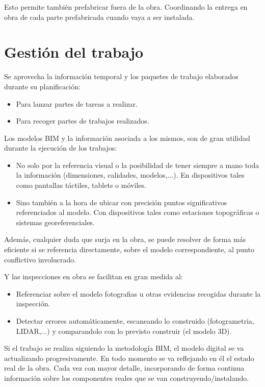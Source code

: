 \documentclass[spanish,12pt,a4paper,final,oneside]{book}
\begin{document}
Esto permite también prefabricar fuera de la obra. Coordinando la entrega en obra de cada parte prefabricada cuando vaya a ser instalada.

\section{Gestión del trabajo}
Se aprovecha la información temporal y los paquetes de trabajo elaborados durante su planificación:
\begin{itemize}
\item Para lanzar partes de tareas a realizar.
\item Para recoger partes de trabajos realizados.
\end{itemize}

Los modelos BIM y la información asociada a los mismos, son de gran utilidad durante la ejecución de los trabajos:
\begin{itemize}
\item No solo por la referencia visual o la posibilidad de tener siempre a mano toda la información (dimensiones, calidades, modelos,...). En dispositivos tales como pantallas táctiles, tablets o móviles.
\item Sino también a la hora de ubicar con precisión puntos significativos referenciados al modelo. Con dispositivos tales como estaciones topográficas o sistemas georeferenciales.
\end{itemize}

Además, cualquier duda que surja en la obra, se puede resolver de forma más eficiente si se referencia directamente, sobre el modelo correspondiente, al punto conflictivo involucrado.

Y las inspecciones en obra se facilitan en gran medida al:
\begin{itemize}
\item Referenciar sobre el modelo fotografias u otras evidencias recogidas durante la inspección.
\item Detectar errores automáticamente, escaneando lo construido (fotogrametria, LIDAR,...) y comparandolo con lo previsto construir (el modelo 3D).
\end{itemize}

Si el trabajo se realiza siguiendo la metodología BIM, el modelo digital se va actualizando progresivamente. En todo momento se va reflejando en él el estado real de la obra. Cada vez con mayor detalle, incorporando de forma continua información sobre los componentes reales que se van construyendo/instalando.
\end{document}
